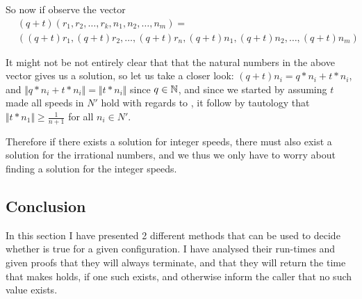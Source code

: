 \begin{description}
So now if observe the vector 
\begin{equation}
\begin{split}
&(q + t)(r_1, r_2, \ldots, r_k, n_1, n_2, \ldots, n_m) =\\ 
&((q + t)r_1, (q + t)r_2, \ldots, (q + t)r_n, (q + t)n_1, (q + t)n_2, \ldots, (q + t)n_m) 
\end{split}
\end{equation}

It might not be not entirely clear that that the natural numbers in the above vector gives us a solution, so let us take a closer look: 
$(q + t)n_i = q * n_i + t * n_i$, and $\Vert q * n_i + t * n_i \Vert = \Vert t * n_i \Vert$ since $q \in \mathbb{N}$, and since we started by assuming $t$ made all speeds in $N\prime$ hold with regards to , it follow by tautology that $\Vert t * n_1 \Vert \geq \frac{1}{n+1}$ for all $n_i \in N\prime$.

Therefore if there exists a solution for integer speeds, there must also exist a solution for the irrational numbers, and we thus we only have to worry about finding a solution for the integer speeds.
\end{description}

\subsection{Conclusion}
In this section I have presented 2 different methods that can be used to decide whether  is true for a given configuration. I have analysed their run-times and given proofs that they will always terminate, and that they will return the time that makes  holds, if one such exists, and otherwise inform the caller that no such value exists.
